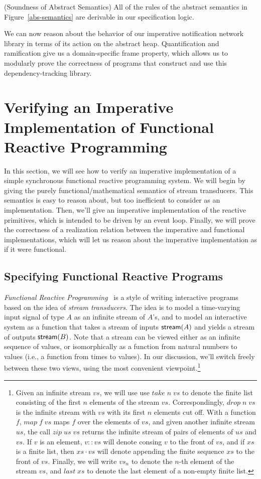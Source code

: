 \documentclass[natbib]{sigplanconf}
\begin{document}
\begin{prop}{(Soundness of Abstract Semantics)}
All of the rules of the abstract semantics in Figure~\ref{abs-semantics} are
derivable in our specification logic. 
\end{prop}

We can now reason about the behavior of our imperative notification
network library in terms of its action on the abstract
heap. Quantification and ramification give us a domain-specific frame
property, which allows us to modularly prove the correctness of
programs that construct and use this dependency-tracking library.

\section{Verifying an Imperative Implementation of Functional Reactive Programming}

In this section, we will see how to verify an imperative
implementation of a simple synchronous functional reactive programming
system. We will begin by giving the purely functional/mathematical
semantics of stream transducers. This semantics is easy to reason
about, but too inefficient to consider as an implementation. Then,
we'll give an imperative implementation of the reactive primitives,
which is intended to be driven by an event loop. Finally, we will 
prove the correctness of a realization relation between the
imperative and functional implementations, which will let us reason
about the imperative implementation as if it were functional. 

\subsection{Specifying Functional Reactive Programs}

\emph{Functional Reactive Programming}~\cite{frp} is a style of
writing interactive programs based on the idea of \emph{stream
  transducers}.  The idea is to model a time-varying input signal of
type $A$ as an infinite stream of $A$'s, and to model an interactive
system as a function that takes a stream of inputs $\mbox{\textsf{{stream}}}({A})$ and
yields a stream of outputs $\mbox{\textsf{{stream}}}({B})$. Note that a stream can be
viewed either as an infinite sequence of values, or isomorphically as
a function from natural numbers to values (i.e., a function from times
to values). In our discussion, we'll switch freely between these two
views, using the most convenient viewpoint.\footnote{Given an infinite stream $vs$, we will use use $take\;n\;vs$ to denote
the finite list consisting of the first $n$ elements of the stream
$vs$. Correspondingly, $drop\;n\;vs$ is the infinite stream with $vs$
with its first $n$ elements cut off. With a function $f$, $map\;f\;vs$
maps $f$ over the elements of $vs$, and given another infinite stream
$us$, the call $zip\;us\;vs$ returns the infinite stream of pairs of
elements of $us$ and $vs$. If $v$ is an element, $v :: vs$ will 
denote consing $v$ to the front of $vs$, and if $xs$ is a finite list, then
$xs \cdot vs$ will denote appending the finite sequence $xs$ to the
front of $vs$. Finally, we will write $vs_n$ to denote the $n$-th element
of the stream $vs$, and $\mathit{last}\;xs$ to denote the last element of
a non-empty finite list.}
\end{document}
